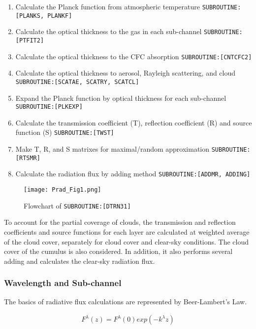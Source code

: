 \begin{enumerate}
\def\labelenumi{\arabic{enumi}.}
\tightlist
\item
  Calculate the Planck function from atmospheric temperature
  \texttt{SUBROUTINE:{[}PLANKS,\ PLANKF{]}}
\item
  Calculate the optical thickness to the gas in each sub-channel
  \texttt{SUBROUTINE:{[}PTFIT2{]}}
\item
  Calculate the optical thickness to the CFC absorption
  \texttt{SUBROUTINE:{[}CNTCFC2{]}}
\item
  Calculate the optical thickness to aerosol, Rayleigh scattering, and
  cloud \texttt{SUBROUTINE:{[}SCATAE,\ SCATRY,\ SCATCL{]}}
\item
  Expand the Planck function by optical thickness for each sub-channel
  \texttt{SUBROUTINE:{[}PLKEXP{]}}
\item
  Calculate the transmission coefficient (T), reflection coefficient (R)
  and source function (S) \texttt{SUBROUTINE:{[}TWST{]}}
\item
  Make T, R, and S matrixes for maximal/random approximation
  \texttt{SUBROUTINE:{[}RTSMR{]}}
\item
  Calculate the radiation flux by adding method
  \texttt{SUBROUTINE:{[}ADDMR,\ ADDING{]}}
\end{enumerate}

\begin{figure}
\centering
\texttt{[image: Prad\_Fig1.png]}
\caption{Flowchart of \texttt{SUBROUTINE:{[}DTRN31{]}}}
\end{figure}

To account for the partial coverage of clouds, the transmission and
reflection coefficients and source functions for each layer are
calculated at weighted average of the cloud cover, separately for cloud
cover and clear-sky conditions. The cloud cover of the cumulus is also
considered. In addition, it also performs several adding and calculates
the clear-sky radiation flux.

\hypertarget{wavelength-and-sub-channel}{%
\subsubsection{Wavelength and
Sub-channel}\label{wavelength-and-sub-channel}}

The basics of radiative flux calculations are represented by
Beer-Lambert's Law.

\begin{eqnarray}
  F^\lambda(z) = F^\lambda(0) exp (-k^\lambda z)
\end{eqnarray}

